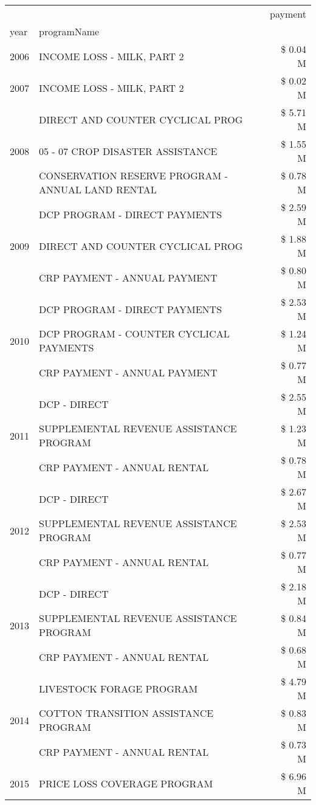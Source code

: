 \begin{tabular}{llr}
\toprule
 &  & payment \\
year & programName &  \\
\midrule
2006 & INCOME LOSS - MILK, PART 2 & \$ 0.04 M \\
\cline{1-3}
2007 & INCOME LOSS - MILK, PART 2 & \$ 0.02 M \\
\cline{1-3}
\multirow[t]{3}{*}{2008} & DIRECT AND COUNTER CYCLICAL PROG & \$ 5.71 M \\
 & 05 - 07 CROP DISASTER ASSISTANCE & \$ 1.55 M \\
 & CONSERVATION RESERVE PROGRAM - ANNUAL LAND RENTAL & \$ 0.78 M \\
\cline{1-3}
\multirow[t]{3}{*}{2009} & DCP PROGRAM - DIRECT PAYMENTS & \$ 2.59 M \\
 & DIRECT AND COUNTER CYCLICAL PROG & \$ 1.88 M \\
 & CRP PAYMENT - ANNUAL PAYMENT & \$ 0.80 M \\
\cline{1-3}
\multirow[t]{3}{*}{2010} & DCP PROGRAM - DIRECT PAYMENTS & \$ 2.53 M \\
 & DCP PROGRAM - COUNTER CYCLICAL PAYMENTS & \$ 1.24 M \\
 & CRP PAYMENT - ANNUAL PAYMENT & \$ 0.77 M \\
\cline{1-3}
\multirow[t]{3}{*}{2011} & DCP - DIRECT & \$ 2.55 M \\
 & SUPPLEMENTAL REVENUE ASSISTANCE PROGRAM & \$ 1.23 M \\
 & CRP PAYMENT - ANNUAL RENTAL & \$ 0.78 M \\
\cline{1-3}
\multirow[t]{3}{*}{2012} & DCP - DIRECT & \$ 2.67 M \\
 & SUPPLEMENTAL REVENUE ASSISTANCE PROGRAM & \$ 2.53 M \\
 & CRP PAYMENT - ANNUAL RENTAL & \$ 0.77 M \\
\cline{1-3}
\multirow[t]{3}{*}{2013} & DCP - DIRECT & \$ 2.18 M \\
 & SUPPLEMENTAL REVENUE ASSISTANCE PROGRAM & \$ 0.84 M \\
 & CRP PAYMENT - ANNUAL RENTAL & \$ 0.68 M \\
\cline{1-3}
\multirow[t]{3}{*}{2014} & LIVESTOCK FORAGE PROGRAM & \$ 4.79 M \\
 & COTTON TRANSITION ASSISTANCE PROGRAM & \$ 0.83 M \\
 & CRP PAYMENT - ANNUAL RENTAL & \$ 0.73 M \\
\cline{1-3}
\multirow[t]{3}{*}{2015} & PRICE LOSS COVERAGE PROGRAM & \$ 6.96 M \\

\end{tabular}
